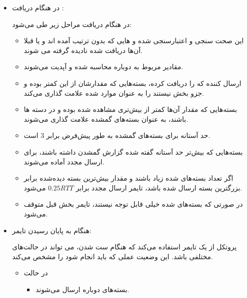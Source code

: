 \documentclass[12pt]{article}
\begin{document}
\begin{enumerate}
\begin{itemize}
\item در هنگام دریافت :

در هنگام دریافت  مراحل زیر طی می‌شود:
\begin{itemize}
	\item 
	این  صحت سنجی و اعتبارسنجی شده و  هایی که بدون ترتیب آمده ‌اند و یا قبلا  آن‌ها دریافت شده نادیده گرفته می شوند.
	
	\item
	مقادیر مربوط به  دوباره محاسبه شده و آپدیت می‌شوند.
	
	\item
	ارسال کننده که  را دریافت کرده، بسته‌هایی که مقدارشان از  این  کمتر بوده و جزو بخش  نیستند را به عنوان موارد  شده علامت گذاری می‌کند.
	
	\item
	بسته‌هایی که مقدار  آن‌ها کمتر از بیش‌تری  مشاهده شده بوده و در دسته  ها باشند، به عنوان بسته‌های گمشده علامت گذاری می‌شوند.
	
	\item
	حد آستانه‌ برای بسته‌های گمشده به طور پیش‌فرض برابر $3$ است.
	
	\item
	بسته‌هایی که بیش‌تر حد آستانه گفته شده گزارش گمشدن داشته باشند، برای ارسال مجدد آماده می‌شوند.
	
	\item
	اگر تعداد بسته‌های   شده زیاد باشند و مقدار بیش‌ترین بسته دیده‌شده برابر بزرگترین بسته ارسال شده باشد، تایمر ارسال مجدد برابر $0.25RTT$ می‌شود.
	
	\item
	در صورتی که بسته‌های  شده خیلی قابل توجه نیستند، تایمر بخش قبل متوقف می‌شود.
	
\end{itemize}

\item هنگام به پایان رسیدن تایمر:

پروتکل  از یک تایمر  استفاده می‌کند که هنگام ست شدن، می تواند در حالت‌های مختلفی باشد. این وضعیت عملی که باید انجام شود را مشخص می‌کند.

\begin{itemize}
	\item در حالت 
	\begin{itemize}
		\item بسته‌های  دوباره ارسال می‌شوند.
	\end{itemize}


\end{itemize}
\end{itemize}
\end{enumerate}
\end{document}
